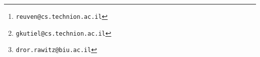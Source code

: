 \title{\titletext}

\date{}

\author[1]{Reuven Bar-Yehuda	\thanks{\texttt{reuven@cs.technion.ac.il}}}
\author[1]{Gilad Kutiel			\thanks{\texttt{gkutiel@cs.technion.ac.il}}}
\author[2]{Dror Rawitz			\thanks{\texttt{dror.rawitz@biu.ac.il}}}

